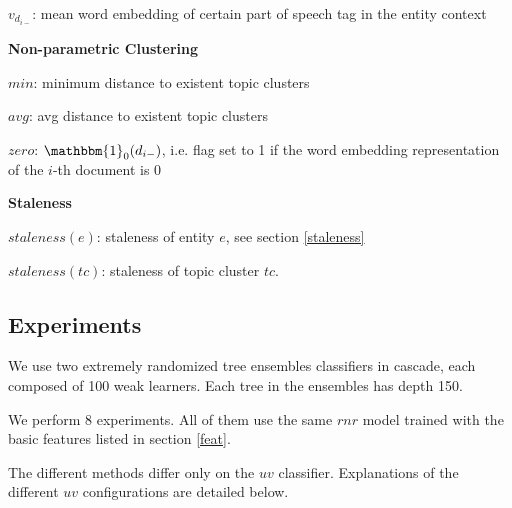 \documentclass{article}
\begin{document}
\begin{itemize*}
    \begin{itemize*}
        \item $v_{d_{i-}}$: mean word embedding of certain part of speech tag in the entity context
    \end{itemize*}
  \item \textbf{Non-parametric Clustering}
    \begin{itemize*}
        \item $min$: minimum distance to existent topic clusters
        \item $avg$: avg distance to existent topic clusters
        \item $zero$: $\mathbbm{1}_{0}{(d_{i-})}$, i.e. flag set to 1 if the word embedding representation of the $i$-th document is $0$
    \end{itemize*}
  \item \textbf{Staleness}
    \begin{itemize*}
        \item $staleness(e)$: staleness of entity $e$, see section \ref{staleness}
        \item $staleness(tc)$: staleness of topic cluster $tc$.
    \end{itemize*}
\end{itemize*}


\subsection{Experiments}

We use two extremely randomized tree ensembles classifiers \cite{GEW06a} in cascade, each composed of 100 weak learners. Each tree in the ensembles has depth 150.

We perform 8 experiments. All of them use the same $rnr$ model trained with the basic features listed in section \ref{feat}.

The different methods differ only on the $uv$ classifier. Explanations of the different $uv$ configurations are detailed below.
\end{document}
